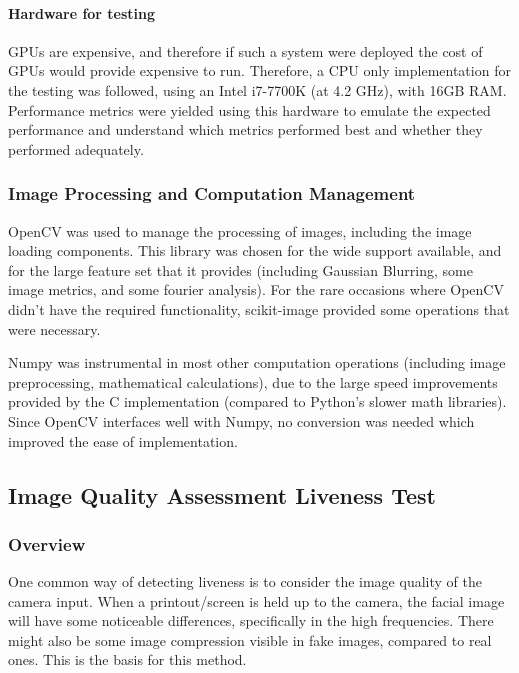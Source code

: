 \documentclass[10pt,a4paper]{article}
\begin{document}
            \paragraph{Hardware for testing}
            GPUs are expensive, and therefore if such a system were deployed the cost of GPUs would provide expensive to run. Therefore, a CPU only implementation for the testing was followed, using an Intel i7-7700K (at 4.2 GHz), with
            16GB RAM. Performance metrics were yielded using this hardware to emulate the expected performance and understand which metrics performed best and whether they performed adequately.

        \subsubsection{Image Processing and Computation Management}
            OpenCV was used to manage the processing of images, including the image loading components. This library was chosen for the wide support available, and for the large feature set that it provides (including Gaussian Blurring, some image metrics, and some fourier analysis).
            For the rare occasions where OpenCV didn't have the required functionality, scikit-image provided some operations that were necessary.
            
            Numpy was instrumental in most other computation operations (including image preprocessing, mathematical calculations), due to the large speed improvements provided by the C implementation (compared to Python's slower math libraries).
            Since OpenCV interfaces well with Numpy, no conversion was needed which improved the ease of implementation.


        \subsection{Image Quality Assessment Liveness Test}
            \subsubsection{Overview}
            One common way of detecting liveness is to consider the image quality of the camera input. When a printout/screen is held up to the camera, the facial image
            will have some noticeable differences, specifically in the high frequencies. There might also be some image compression visible in fake images, compared to real ones.
            This is the basis for this method.
\end{document}
